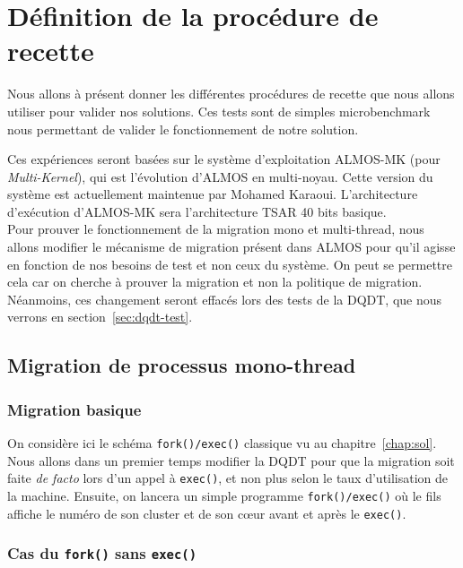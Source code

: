 \chapter{Définition de la procédure de recette}
\label{chap:tests}

  Nous allons à présent donner les différentes procédures de recette que nous
  allons utiliser pour valider nos solutions. Ces tests sont de simples
  microbenchmark nous permettant de valider le fonctionnement de notre solution.

  Ces expériences seront basées sur le système d'exploitation ALMOS-MK (pour
  \textit{Multi-Kernel}), qui est l'évolution d'ALMOS en multi-noyau. Cette
  version du système est actuellement maintenue par Mohamed
  Karaoui. L'architecture d'exécution d'ALMOS-MK sera l'architecture TSAR 40
  bits basique.\\

  Pour prouver le fonctionnement de la migration mono et multi-thread, nous
  allons modifier le mécanisme de migration présent dans ALMOS pour qu'il agisse
  en fonction de nos besoins de test et non ceux du système. On peut se
  permettre cela car on cherche à prouver la migration et non la politique de
  migration. Néanmoins, ces changement seront effacés lors des tests de la DQDT,
  que nous verrons en section~\ref{sec:dqdt-test}.

  \section{Migration de processus mono-thread}

    \subsection{Migration basique}

      On considère ici le schéma \texttt{fork()/exec()} classique vu au
      chapitre~\ref{chap:sol}. Nous allons dans un premier temps modifier la
      DQDT pour que la migration soit faite \textit{de facto} lors d'un appel à
      \texttt{exec()}, et non plus selon le taux d'utilisation de la
      machine. Ensuite, on lancera un simple programme \texttt{fork()/exec()} où
      le fils affiche le numéro de son cluster et de son c\oe ur avant et après
      le \texttt{exec()}.

    \subsection{Cas du \texttt{fork()} sans \texttt{exec()}}

